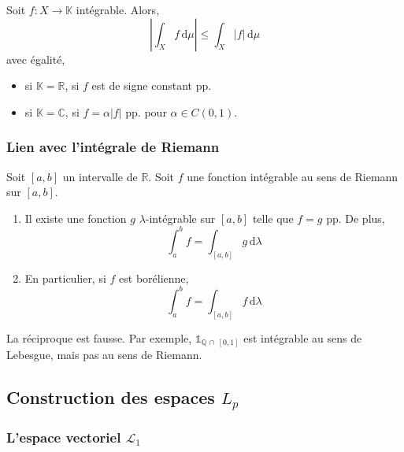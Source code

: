   \begin{proposition}
    Soit $f : X \rightarrow \mathbb{K}$ intégrable. Alors,
    \[ \left\vert \int_X f \, \mathrm{d}\mu \right\vert \leq \int_X \vert f \vert \, \mathrm{d}\mu \]
    avec égalité,
    \begin{itemize}
      \item si $\mathbb{K} = \mathbb{R}$, si $f$ est de signe constant pp.
      \item si $\mathbb{K} = \mathbb{C}$, si $f = \alpha \vert f \vert$ pp. pour $\alpha \in C(0,1)$.
    \end{itemize}
  \end{proposition}

  \subsubsection{Lien avec l'intégrale de Riemann}

  \begin{proposition}
    Soit $[a,b]$ un intervalle de $\mathbb{R}$. Soit $f$ une fonction intégrable au sens de Riemann sur $[a,b]$.
    \begin{enumerate}[label={\bfseries(\roman*)}]
      \item Il existe une fonction $g$ $\lambda$-intégrable sur $[a,b]$ telle que $f = g$ pp. De plus,
      \[ \int_a^b f = \int_{[a,b]} g \, \mathrm{d}\lambda \]
      \item En particulier, si $f$ est borélienne,
      \[ \int_a^b f = \int_{[a,b]} f \, \mathrm{d}\lambda \]
    \end{enumerate}
  \end{proposition}

  \begin{cexample}
    La réciproque est fausse. Par exemple, $\mathbb{1}_{\mathbb{Q} \, \cap \, [0,1]}$ est intégrable au sens de Lebesgue, mais pas au sens de Riemann.
  \end{cexample}

  \subsection{Construction des espaces \texorpdfstring{$L_p$}{Lₚ}}

  \subsubsection{L'espace vectoriel \texorpdfstring{$\mathcal{L}_1$}{L₁}}

